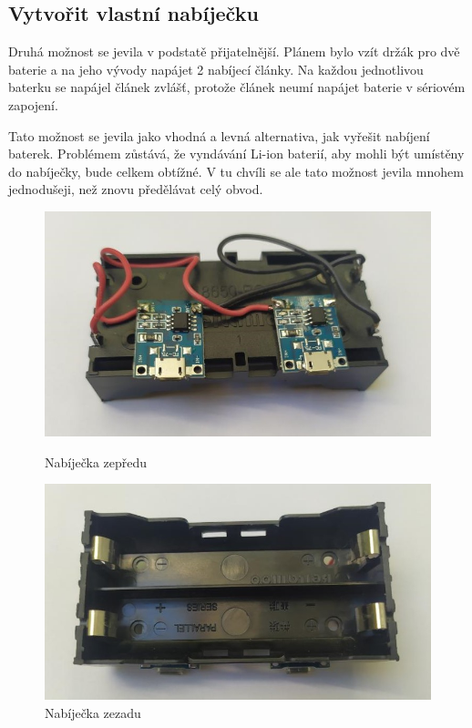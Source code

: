 \subsection{Vytvořit vlastní nabíječku}
Druhá možnost se jevila v podstatě přijatelnější. Plánem bylo vzít držák pro dvě baterie a na jeho vývody napájet 2 nabíjecí články. Na každou jednotlivou baterku se napájel článek zvlášť, protože článek neumí napájet baterie v sériovém zapojení.

Tato možnost se jevila jako vhodná a levná alternativa, jak vyřešit nabíjení baterek. 
Problémem zůstává, že vyndávání Li-ion baterií, aby mohli být umístěny do nabíječky, bude celkem obtížné. V tu chvíli se ale tato možnost jevila mnohem jednodušeji, než znovu předělávat celý obvod.

    \begin{figure}[htbp]
	\centering
	\begin{minipage}[b]{0.45\textwidth}
		\centering
		\includegraphics[width=1\textwidth]{img/02 ele/Nabijecka.jpg}
		\caption{Nabíječka zepředu}
	\end{minipage}
	\qquad
	\begin{minipage}[b]{0.45\textwidth}
		\centering
		\includegraphics[width=1\textwidth]{img/02 ele/Nabijecka 2.jpg}
		\caption{Nabíječka zezadu}
	\end{minipage}
\end{figure}
\newpage



